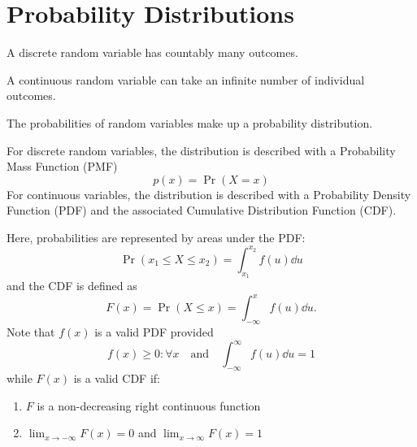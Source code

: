 \documentclass{article}
\begin{document}
\section{Probability Distributions}
\begin{definition}
    A discrete random variable has countably many outcomes.
\end{definition}
\begin{definition}
    A continuous random variable can take an infinite number of individual outcomes.
\end{definition}
\begin{definition}
    The probabilities of random variables make up a probability distribution.

    For discrete random variables, the distribution is described with a Probability
    Mass Function (PMF)
    \begin{equation*}
        p(x) = \Pr{\left( X = x \right)}
    \end{equation*}
    For continuous variables, the distribution is described with a Probability
    Density Function (PDF) and the associated Cumulative Distribution Function (CDF).

    Here, probabilities are represented by areas under the PDF\@:
    \begin{equation*}
        \Pr{\left( x_1 \leq X \leq x_2 \right)} = \int_{x_1}^{x_2} f(u) \dd{u}
    \end{equation*}
    and the CDF is defined as
    \begin{equation*}
        F(x) = \Pr{\left( X \leq x \right)} = \int_{-\infty}^{x} f(u) \dd{u}.
    \end{equation*}
    Note that \(f(x)\) is a valid PDF provided
    \begin{equation*}
        f(x) \geq 0:\forall x \quad \text{and} \quad \int_{-\infty}^{\infty} f(u) \dd{u} = 1
    \end{equation*}
    while \(F(x)\) is a valid CDF if:
    \begin{enumerate}
        \item \(F\) is a non-decreasing right continuous function
        \item \(\lim_{x\to-\infty} F(x) = 0\) and \(\lim_{x\to\infty} F(x) = 1\)
    \end{enumerate}
\end{definition}
\end{document}
